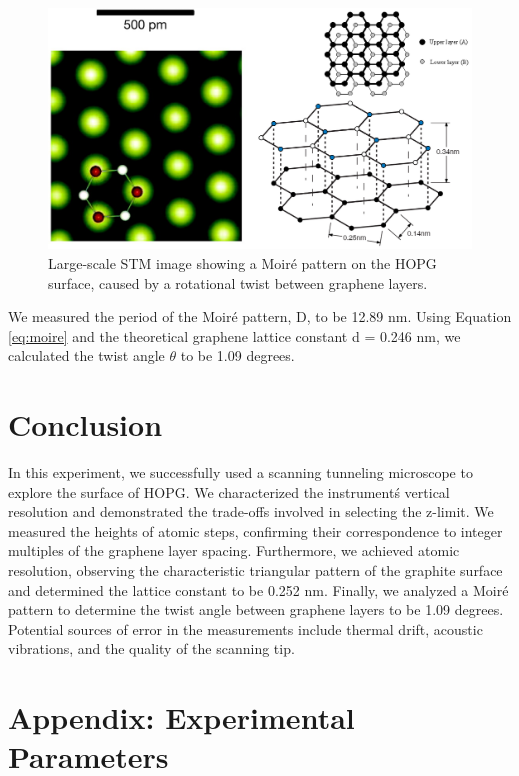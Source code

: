 \documentclass[12pt,a4paper]{article}
\begin{document}
\begin{figure}[H]
    \centering
    \includegraphics[width=0.6\linewidth]{../data/gergo_data/hopg.png}
    \caption{Large-scale STM image showing a Moiré pattern on the HOPG surface, caused by a rotational twist between graphene layers.}
    \label{fig:moire}
\end{figure}

We measured the period of the Moiré pattern, D, to be 12.89 nm. Using Equation \ref{eq:moire} and the theoretical graphene lattice constant d = 0.246 nm, we calculated the twist angle $\theta$ to be 1.09 degrees.

\section{Conclusion}
In this experiment, we successfully used a scanning tunneling microscope to explore the surface of HOPG. We characterized the instrument\'s vertical resolution and demonstrated the trade-offs involved in selecting the z-limit. We measured the heights of atomic steps, confirming their correspondence to integer multiples of the graphene layer spacing. Furthermore, we achieved atomic resolution, observing the characteristic triangular pattern of the graphite surface and determined the lattice constant to be 0.252 nm.
Finally, we analyzed a Moiré pattern to determine the twist angle between graphene layers to be 1.09 degrees. Potential sources of error in the measurements include thermal drift, acoustic vibrations, and the quality of the scanning tip.

\printbibliography

\section*{Appendix: Experimental Parameters}
\end{document}
